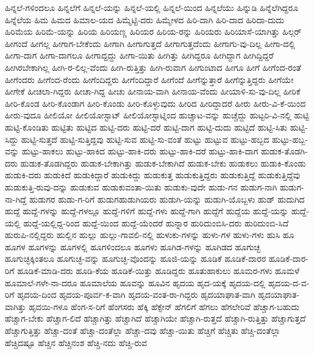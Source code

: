 {ಹಿನ್ನಲೆ-ಗಳಿಂದಲೂ
ಹಿನ್ನಲೆಗೆ
ಹಿನ್ನಲೆ-ಯನ್ನು
ಹಿನ್ನಲೆ-ಯಲ್ಲಿ
ಹಿನ್ನಲೆ-ಯಿಂದ
ಹಿನ್ನಲೆಯು
ಹಿನ್ನುಡಿ
ಹಿನ್ನೆಲೆಗಿದ್ದರೂ
ಹಿನ್ನೆಲೆಯ
ಹಿಮ
ಹಿಮದ
ಹಿಮಾಲ-ಯದ
ಹಿಮ್ಮೆಟ್ಟಿ-ದರು
ಹಿಮ್ಮೇಳದ
ಹಿರಿ-ದಾಗಿ
ಹಿರಿ-ದಾದ
ಹಿರಿದಾ-ದುದು
ಹಿರಿಮೆಯ
ಹಿರಿಮೆ-ಯನ್ನು
ಹಿರಿಯ
ಹಿರಿಯಣ್ಣ
ಹಿರಿಯರ
ಹಿರಿಯ-ರನ್ನು
ಹಿರಿಯರು
ಹಿರಿಯಾಸೆ-ಯಾಗಿತ್ತು
ಹಿಲ್ಗರ್
ಹೀಗಂದೆ
ಹೀಗಲ್ಲ
ಹೀಗಾಗ-ಬೇಕೆಂದು
ಹೀಗಾಗಿ
ಹೀಗಾಗುತ್ತದೆ
ಹೀಗಾಗುತ್ತದೆಂದು
ಹೀಗಾಗು-ವು-ದಿಲ್ಲ
ಹೀಗಾ-ದಲ್ಲಿ
ಹೀಗಾ-ದಾಗ
ಹೀಗಾ-ದಾಗಲೂ
ಹೀಗಾದ್ದದ್ದು
ಹೀಗಾ-ಯಿತು
ಹೀಗಿತ್ತು
ಹೀಗಿದ್ದರೂ
ಹೀಗಿದ್ದಾಗ
ಹೀಗಿದ್ದಿದ್ದರೆ
ಹೀಗಿರಬೇಕಾಗಿಲ್ಲ
ಹೀಗಿ-ರ-ಲಿಲ್ಲ-ವೆಂದು
ಹೀಗಿ-ರುತ್ತಿತ್ತು
ಹೀಗಿ-ರುವಾಗ
ಹೀಗುಂಟಾದ
ಹೀಗೂ
ಹೀಗೆ
ಹೀಗೆಂದ-ರಂತೆ
ಹೀಗೆಂದರು
ಹೀಗೆಂದ-ರೆಂದು
ಹೀಗೆಂದಿದ್ದರು
ಹೀಗೆಂದಿದ್ದಾರೆ
ಹೀಗೆಂದೆ
ಹೀಗೆನ್ನುತ್ತಾರೆ
ಹೀಗೆನ್ನುತ್ತಿದ್ದರು
ಹೀಗೆಯೇ
ಹೀಗೇಕೆ
ಹೀಚಲಾ-ಗಿದ್ದರು
ಹೀಚಾ-ಗಿದ್ದ
ಹೀಚು
ಹೀನಾಯ-ವಾಗಿ
ಹೀನಾಯ-ವೆಂದು
ಹೀಯಾಳಿ-ಸು-ವು-ದಿಲ್ಲ
ಹೀರಿಕೆ
ಹೀರಿ-ಕೊಂಡ
ಹೀರಿ-ಕೊಂಡಾಗ
ಹೀರಿ-ಕೊಂಡು
ಹೀರಿ-ಕೊಳ್ಳುವುದು
ಹೀರಿದ
ಹೀರಿದ್ದಾದರೆ
ಹೀರು
ಹೀರು-ವಿ-ಕೆ-ಯಿಂದ
ಹೀರು-ವುದೂ
ಹೀಲಿಯೋ
ಹೀಲಿಯೋಸ್ಟಾಟ್
ಹೀಲಿಯೋಸ್ಟಾಟ್ನಿಂದ
ಹುಚ್ಚಾಟ-ವನ್ನು
ಹುಚ್ಚೆದ್ದು
ಹುಟ್ಟರಿ-ವಿ-ನಲ್ಲಿ
ಹುಟ್ಟಿ
ಹುಟ್ಟಿ-ಕೊಂಡಿತು
ಹುಟ್ಟಿತು
ಹುಟ್ಟಿದ
ಹುಟ್ಟಿ-ದರು
ಹುಟ್ಟಿ-ದರೆ
ಹುಟ್ಟಿ-ದಾಗ
ಹುಟ್ಟಿ-ದುದು
ಹುಟ್ಟಿದೆ
ಹುಟ್ಟಿ-ಸಿತು
ಹುಟ್ಟಿ-ಸಿದ್ದು
ಹುಟ್ಟಿ-ಸುತ್ತದೆ
ಹುಟ್ಟಿ-ಸುತ್ತಿದ್ದವು
ಹುಟ್ಟಿ-ಸುವ
ಹುಟ್ಟಿ-ಸು-ವಂತೆ
ಹುಟ್ಟು
ಹುಟ್ಟುವ
ಹುಟ್ಟು-ಹಬ್ಬದ
ಹುಟ್ಟು-ಹಬ್ಬ-ವನ್ನು
ಹುಟ್ಟು-ಹಾಕಲು
ಹುಟ್ಟು-ಹಾಕಿದ
ಹುಟ್ಟು-ಹಾಕಿ-ದರು
ಹುಟ್ಟು-ಹಾಕಿ-ದರೆ
ಹುಟ್ಟು-ಹಾಕಿ-ದಾಗ
ಹುಡುಕ-ತೊಡಗಿ-ದರು
ಹುಡುಕ-ತೊಡಗಿದ್ದರು
ಹುಡುಕ-ಬೇಕಾಗಿತ್ತು
ಹುಡುಕ-ಬೇಕಾಗಿದೆ
ಹುಡುಕ-ಬೇಕು
ಹುಡುಕಲು
ಹುಡುಕಿ-ಕೊಂಡು
ಹುಡುಕಿ-ದರು
ಹುಡುಕಿದೆ
ಹುಡುಕಿದ್ದಾರೆ
ಹುಡುಕಿದ್ದು
ಹುಡುಕುತ್ತ
ಹುಡುಕುತ್ತಿದ್ದರು
ಹುಡುಕುತ್ತಿದ್ದೆ
ಹುಡುಕುತ್ತಿದ್ದೆವು
ಹುಡುಕುತ್ತಿ-ರುವು-ದನ್ನು
ಹುಡುಕುವ
ಹುಡುಕುವಂತಾ-ಯಿತು
ಹುಡುಕು-ವುದೇ
ಹುಡು-ಗನ
ಹುಡುಗ-ನಾಗಿ
ಹುಡುಗ-ನಾ-ಗಿದ್ದೆ
ಹುಡುಗರ
ಹುಡು-ಗ-ರಿಗೆ
ಹುಡುಗಹುಡುಗಿಯರು
ಹುಡುಗಿ-ಯನ್ನು
ಹುಡುಗಿ-ಯೊಬ್ಬಳು
ಹುಡ್
ಹುದುಗಿದ
ಹುದ್ದೆ
ಹುದ್ದೆ-ಗಳನ್ನು
ಹುದ್ದೆ-ಗಳಲ್ಲೂ
ಹುದ್ದೆ-ಗಳಿಗೆ
ಹುದ್ದೆ-ಗಳು
ಹುದ್ದೆ-ಗಾಗಿ
ಹುದ್ದೆಗೆ
ಹುದ್ದೆಯ
ಹುದ್ದೆ-ಯನ್ನು
ಹುದ್ದೆ-ಯಲ್ಲಿ
ಹುದ್ದೆ-ಯಲ್ಲಿದ್ದ-ರಿಂದ
ಹುದ್ದೆ-ಯಿಂದ
ಹುದ್ದೆ-ಯೆಂದರೆ
ಹುನ್ನಾರ
ಹುರಿದುಂಬಿಸಿ-ದರು
ಹುರಿದುಂಬಿ-ಸಿದೆ
ಹುರುಪಿ-ನಲ್ಲಿದ್ದರು
ಹುಲ್ಲಿನ
ಹುಲ್ಲು
ಹುಲ್ಲು-ಗಾವಲಿ-ನಲ್ಲಿ
ಹುಳುಕು-ಗಳನ್ನು
ಹುಳು-ಗಳ
ಹುಳು-ಗಳು
ಹುಸಿ
ಹೂ
ಹೂಗಳ
ಹೂಗಳನ್ನು
ಹೂಗಳಲ್ಲಿ
ಹೂಗಳಿಂದಲೂ
ಹೂಗಳು
ಹೂಗಿಡ-ಗಳನ್ನು
ಹೂಗಿಡದ
ಹೂಗುಚ್ಛ
ಹೂಗುಚ್ಛಕ್ಕಿಂತಲೂ
ಹೂಗುಚ್ಛ-ವನ್ನು
ಹೂಗುಚ್ಛ-ವೊಂದನ್ನು
ಹೂಜಿ-ಯನ್ನು
ಹೂಡಿಕೆ
ಹೂಡಿಕೆ-ದಾರರ
ಹೂಡಿಕೆ-ದಾರ-ರಿಗೆ
ಹೂಡಿಕೆ-ಮಾಡಿ-ದರು
ಹೂಡಿ-ಕೆಯ
ಹೂಡಿಕೆ-ಯಿತ್ತು
ಹೂಡಿದ್ದರು
ಹೂತುಹಾಕುಲು
ಹೂಮರ-ಗಳು
ಹೂಮಳೆ
ಹೂಮಾಲೆ-ಗಳೇ-ನಾ-ದರೂ
ಹೂಮಾಲೆಯ
ಹೂವನ್ನು
ಹೂವಿನ
ಹೃದಯ
ಹೃದ-ಯಕ್ಕೆ
ಹೃದಯ-ದಲ್ಲಿ
ಹೃದಯ-ದ-ವ-ರಿಗೆ
ಹೃದಯ-ದಿಂದ
ಹೃದಯ-ಪೂರ್ವ-ಕ-ವಾಗಿ
ಹೃದಯ-ವಂತ-ರಾ-ಗಿದ್ದರು
ಹೃದಯಾಘಾತ-ವಾಗಿ
ಹೃದಯಾಘಾತ-ವಾಗಿತ್ತು
ಹೃದಯಿ-ಗಳೂ
ಹೆಂಗ-ಸ-ರಿಗೆ
ಹೆಂಗಸರು
ಹೆಕ್ಕಿ
ಹೆಕ್ಸೇನ್
ಹೆಗಲಿಗೆ
ಹೆಗಲು
ಹೆಗಲೇರಿವೆ
ಹೆಚ್ಚಾಗ-ಬಹುದು
ಹೆಚ್ಚಾಗ-ಬೇಕು
ಹೆಚ್ಚಾಗ-ಲಿದೆ
ಹೆಚ್ಚಾಗಿತ್ತು
ಹೆಚ್ಚಾಗಿದೆ
ಹೆಚ್ಚಾಗಿಯೇ
ಹೆಚ್ಚಾಗಿ-ರುತ್ತದೆ
ಹೆಚ್ಚಾಗಿ-ರುತ್ತಿತ್ತು
ಹೆಚ್ಚಾಗುತ್ತದೆ
ಹೆಚ್ಚಾಗುತ್ತಿತ್ತು
ಹೆಚ್ಚಾ-ದಂತೆ
ಹೆಚ್ಚಾ-ದಂತೆಲ್ಲಾ
ಹೆಚ್ಚಾ-ದವು
ಹೆಚ್ಚಾ-ಯಿತು
ಹೆಚ್ಚಿಗೆ
ಹೆಚ್ಚಿತು
ಹೆಚ್ಚಿ-ದಂತೆಲ್ಲಾ
ಹೆಚ್ಚಿದಷ್ಟೂ
ಹೆಚ್ಚಿನ
ಹೆಚ್ಚಿನಂಶ
ಹೆಚ್ಚಿ-ನದು
ಹೆಚ್ಚಿ-ರುವ
}
